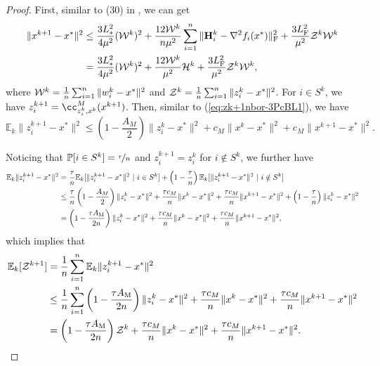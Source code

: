\documentclass[11pt]{article}
\begin{document}
	
	\begin{proof}
		
		First, similar to (30) in \citep{qian2021basis}, we can get 
		\begin{align}
			\|x^{k+1}-x^*\|^2 & \leq \frac{3L_{*}^2}{4\mu^2}({\cal W}^k)^2 + \frac{12{\cal W}^k}{n\mu^2} \sum_{i=1}^n \|\mathbf{H}_i^k-\nabla^2 f_i(x^*)\|^2_{\rm F} + \frac{3L_{\rm F}^2}{\mu^2} {\cal Z}^k {\cal W}^k \nonumber \\ 
			& = \frac{3L_{*}^2}{4\mu^2}({\cal W}^k)^2  +  \frac{12{\cal W}^k}{\mu^2} {\cal H}^k + \frac{3L_{\rm F}^2}{\mu^2} {\cal Z}^k {\cal W}^k, \label{eq:xk+1-3PcBL2}
		\end{align}
		where ${\cal W}^k = \frac{1}{n} \sum_{i=1}^n \|w_i^k - x^*\|^2$ and ${\cal Z}^k = \frac{1}{n} \sum_{i=1}^n \|z_i^k-x^*\|^2$. For $i \in S^k$, we have $z_i^{k+1} = \cc^M_{z_i^k, x^k} (x^{k+1})$.  Then, similar to (\ref{eq:zk+1nbor-3PcBL1}), we have 
		$$
		\mathbb{E}_k \|z_i^{k+1} - x^*\|^2 \leq \left(  1 - \frac{A_M}{2}  \right) \|z_i^k - x^*\|^2 + c_M\|x^k-x^*\|^2 + c_M \|x^{k+1}-x^*\|^2. 
		$$
		
		Noticing that $\mathbb{P}[i \in S^k] = \nicefrac{\tau}{n}$ and $z_i^{k+1}=z_i^k$ for $i\notin S^k$, we further have 
		\begin{align*}
			\mathbb{E}_k\|z_i^{k+1} - x^*\|^2 & = \frac{\tau}{n} \mathbb{E}_k[\|z_i^{k+1} - x^*\|^2 \ | \  i\in S^k ] + \left(  1 - \frac{\tau}{n}  \right) \mathbb{E}_k[\|z_i^{k+1} - x^*\|^2 \ | \  i\notin S^k ] \\ 
			& \leq \frac{\tau}{n} \left(1 - \frac{A_M}{2} \right) \|z_i^k - x^*\|^2 + \frac{\tau c_M}{n} \|x^k-x^*\|^2 +  \frac{\tau c_M}{n} \|x^{k+1} - x^*\|^2 + \left(  1 - \frac{\tau}{n}  \right) \|z_i^k-x^*\|^2 \\ 
			& = \left(  1 - \frac{\tau A_{\rm M}}{2n}  \right) \|z_i^k-x^*\|^2 + \frac{\tau c_M}{n} \|x^k-x^*\|^2 +  \frac{\tau c_M}{n} \|x^{k+1} - x^*\|^2, 
		\end{align*}
		which implies that 
		\begin{align}
			\mathbb{E}_k [{\cal Z}^{k+1}] & = \frac{1}{n} \sum_{i=1}^n \mathbb{E}_k \|z_i^{k+1}-x^*\|^2  \nonumber \\ 
			& \leq \frac{1}{n} \sum_{i=1}^n \left(  1 - \frac{\tau A_{\rm M}}{2n}  \right) \|z_i^k-x^*\|^2 + \frac{\tau c_M}{n} \|x^k-x^*\|^2 +  \frac{\tau c_M}{n} \|x^{k+1} - x^*\|^2  \nonumber \\ 
			& =  \left(  1 - \frac{\tau A_{\rm M}}{2n}  \right) {\cal Z}^k +  \frac{\tau c_M}{n} \|x^k-x^*\|^2 +  \frac{\tau c_M}{n} \|x^{k+1} - x^*\|^2. \label{eq:Zk+1-3PcBL2}
		\end{align}
		

\end{proof}
\end{document}
